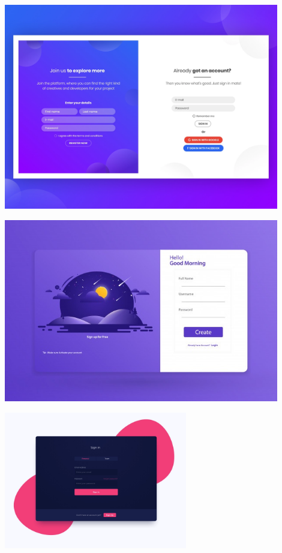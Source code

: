 \documentclass[]{article}
\begin{document}
\begin{center}
\includegraphics[width=0.9\textwidth]{images/image10.png}
\end{center}


\begin{center}
\includegraphics[width=0.9\textwidth]{images/image11.png}
\end{center}

\begin{center}
\includegraphics[width=0.6\textwidth]{images/image12.png}
\end{center}
\end{document}
